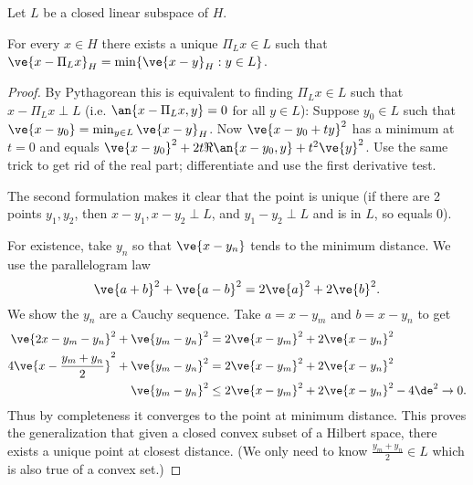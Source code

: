 Let $L$ be a closed linear subspace of $H$.
\begin{lem}
For every $x\in H$ there exists a unique $\Pi_Lx\in L$ such that $\ve{x-\Pi_Lx}_H=\min\{\ve{x-y}_H:y\in L\}$.
\end{lem}
\begin{proof}
By Pythagorean this is equivalent to finding $\Pi_Lx\in L$ such that $x-\Pi_L x\perp L$ (i.e. $\an{x-\Pi_Lx,y}=0$ for all $y\in L$): Suppose $y_0\in L$ such that $\ve{x-y_0}=\min_{y\in L}\ve{x-y}_H$. Now $\ve{x-y_0+ty}^2$ has a minimum at $t=0$ and equals $\ve{x-y_0}^2+2t\Re\an{x-y_0,y}+t^2\ve{y}^2$. Use the same trick to get rid of the real part; differentiate and use the first derivative test.

The second formulation makes it clear that the point is unique (if there are 2 points $y_1,y_2$, then $x-y_1,x-y_2\perp L$, and $y_1-y_2\perp L$ and is in $L$, so equals 0).

For existence, take $y_n$ so that $\ve{x-y_n}$ tends to the minimum distance. We use the parallelogram law
\[
\ve{a+b}^2+\ve{a-b}^2=2\ve{a}^2+2\ve{b}^2.
\]
We show the $y_n$ are a Cauchy sequence. Take $a=x-y_m$ and $b=x-y_n$ to get
\begin{align*}
\ve{2x-y_m-y_n}^2+\ve{y_m-y_n}^2&=2\ve{x-y_m}^2 +2\ve{x-y_n}^2\\
4\ve{x-\frac{y_m+y_n}{2}}^2+\ve{y_m-y_n}^2&=2\ve{x-y_m}^2 +2\ve{x-y_n}^2\\
\ve{y_m-y_n}^2&\le2\ve{x-y_m}^2+2\ve{x-y_n}^2-4\de^2\to 0.
\end{align*}
Thus by completeness it converges to the point at minimum distance. This proves the generalization that given a closed convex subset of a Hilbert space, there exists a unique point at closest distance.
(We only need to know $\frac{y_m+y_n}{2}\in L$ which is also true of a convex set.)
\end{proof}
